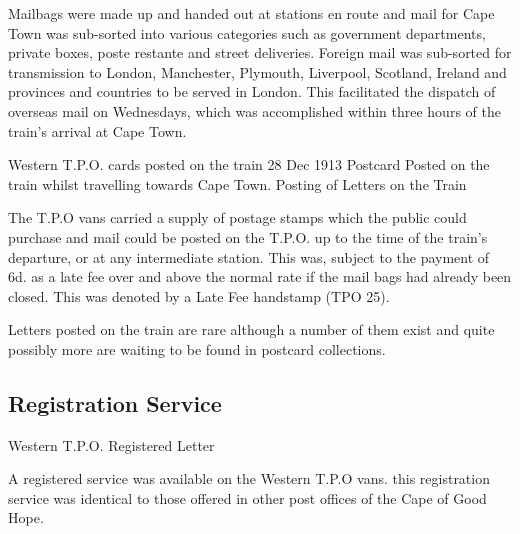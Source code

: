 Mailbags were made up and handed out at stations en route and 
mail for Cape Town was sub-sorted into various categories such 
as government departments, private boxes, poste restante and 
street deliveries. Foreign mail was sub-sorted for transmission 
to London, Manchester, Plymouth, Liverpool, Scotland, Ireland 
and provinces and countries to be served in London. This facilitated 
the dispatch of overseas mail on Wednesdays, which was accomplished 
within three hours of the train's arrival at Cape Town.

 
Western T.P.O. cards posted on the train
28 Dec 1913 Postcard Posted on the train whilst travelling towards Cape Town.
Posting of Letters on the Train

The T.P.O vans carried a supply of postage stamps which the public 
could purchase and mail could be posted on the T.P.O. up to the time 
of the train's departure, or at any intermediate station. This was, 
subject to the payment of 6d. as a late fee over and above the normal 
rate if the mail bags had already been closed. This was denoted by a 
Late Fee handstamp (TPO 25). 

Letters posted on the train are rare 
although a number of them exist and quite possibly more are 
waiting to be found in postcard collections.

 

 
\subsection{Registration Service} 
Western T.P.O. Registered Letter
 
 

A registered service was available 
on the Western T.P.O vans. this registration service was identical 
to those offered in other post offices of the Cape of Good Hope.

 

 

 

 

 

 

 

           